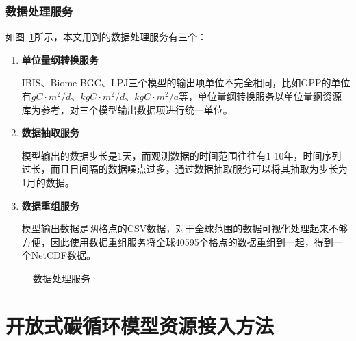 \subsubsection{数据处理服务}
如图~\ref{fig:data-process-service}所示，本文用到的数据处理服务有三个：
\begin{enumerate}[(1)]
    \item \textbf{单位量纲转换服务}
    
    IBIS、Biome-BGC、LPJ三个模型的输出项单位不完全相同，比如GPP的单位有$gC \cdot m^2/d$、$kgC \cdot m^2/d$、$kgC \cdot m^2/a$等，单位量纲转换服务以单位量纲资源库为参考，对三个模型输出数据项进行统一单位。

    \item \textbf{数据抽取服务}
    
    模型输出的数据步长是1天，而观测数据的时间范围往往有1-10年，时间序列过长，而且日间隔的数据噪点过多，通过数据抽取服务可以将其抽取为步长为1月的数据。
    
    \item \textbf{数据重组服务}
    
    模型输出数据是网格点的CSV数据，对于全球范围的数据可视化处理起来不够方便，因此使用数据重组服务将全球40595个格点的数据重组到一起，得到一个NetCDF数据。

\end{enumerate}

\begin{figure}[!htbp]
    \centering
    \hfill
    \hfill
    \caption{数据处理服务}
    \label{fig:data-process-service}
\end{figure}


\section{开放式碳循环模型资源接入方法}
\label{sec:model-joinup}


